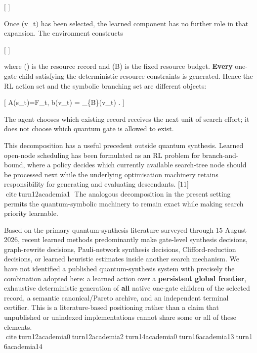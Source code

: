 \documentclass[
]{article}
\begin{document}
{[}   {]}

Once (v\_t) has been selected, the learned component has no further role
in that expansion. The environment constructs

{[}   {]}

where (\boldsymbol\rho) is the resource record and (\mathbf B) is the
fixed resource budget. \textbf{Every} one-gate child satisfying the
deterministic resource constraints is generated. Hence the RL action set
and the symbolic branching set are different objects:

{[} \textbar{}\mathcal A(s\_t)\textbar=\textbar{}\mathcal F\_t\textbar,
\qquad b(v\_t) = \left\textbar{}
\_\{\mathbf B\}(v\_t) \right\textbar.  {]}

The agent chooses which existing record receives the next unit of search
effort; it does not choose which quantum gate is allowed to exist.

This decomposition has a useful precedent outside quantum synthesis.
Learned open-node scheduling has been formulated as an RL problem for
branch-and-bound, where a policy decides which currently available
search-tree node should be processed next while the underlying
optimisation machinery retains responsibility for generating and
evaluating descendants. {[}11{]} citeturn12academia1 The analogous
decomposition in the present setting permits the quantum-symbolic
machinery to remain exact while making search priority learnable.

Based on the primary quantum-synthesis literature surveyed through 15
August 2026, recent learned methods predominantly make gate-level
synthesis decisions, graph-rewrite decisions, Pauli-network synthesis
decisions, Clifford-reduction decisions, or learned heuristic estimates
inside another search mechanism. We have not identified a published
quantum-synthesis system with precisely the combination adopted here: a
learned action over a \textbf{persistent global frontier}, exhaustive
deterministic generation of \textbf{all} native one-gate children of the
selected record, a semantic canonical/Pareto archive, and an independent
terminal certifier. This is a literature-based positioning rather than a
claim that unpublished or unindexed implementations cannot share some or
all of these elements.
citeturn12academia0turn12academia2turn14academia0turn16academia13turn16academia14
\end{document}
